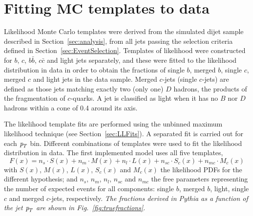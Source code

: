 


\section{Fitting MC templates to data}\label{sec:FitsResults}



Likelihood Monte Carlo templates were derived from the simulated dijet sample described in Section~\ref{sec:analysis}, from all jets passing the selection criteria defined in Section~\ref{sec:EventSelection}. Templates of likelihood were constructed for $b$, $c$, $b\bar{b}$, $c\bar{c}$ and light jets separately, and these were fitted to the likelihood distribution in data in order to obtain the fractions of single $b$, merged $b$, single $c$, merged $c$ and light jets in the data sample. Merged $c$-jets (single $c$-jets) are defined as those jets matching exactly two (only one) $D$ hadrons, the products of the fragmentation of $c$-quarks. A jet is classified as light when it has no $B$ nor $D$ hadrons within a cone of 0.4 around its axis.

The likelihood template fits are performed using the unbinned maximum likelihood technique (see Section~\ref{sec:LLFits}). A separated fit is carried out for each ${\emph{p}_{T}}$ bin. Different combinations of templates were used to fit the likelihood distribution in data. The first implemented model uses all five templates,
%
\begin{equation}
F(x) = n_s \cdot S(x) + n_m \cdot M(x) + n_l \cdot L(x) + n_{sc} \cdot S_c(x) + n_{mc} \cdot M_c(x)
\end{equation}
%
with $S(x)$, $M(x)$, $L(x)$, $S_c(x)$ and $M_c(x)$ the likelihood PDFs for the different hypothesis; and $n_s$, $n_m$, $n_l$, $n_{sc}$ and $n_{mc}$ the free parameters representing the number of expected events for all components: single $b$, merged $b$, light, single $c$ and merged $c$-jets, respectively.  %
\emph{The fractions derived in {\sc Pythia}  as a function of the jet ${\emph{p}_{T}}$ are shown in Fig.~\ref{fig:truefractions}.}


